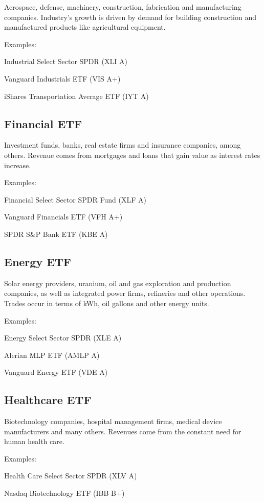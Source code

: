 \documentclass[11pt]{article}
\begin{document}
Aerospace, defense, machinery, construction, fabrication and manufacturing companies. Industry's growth is driven by demand for building construction and manufactured products like agricultural equipment.


Examples:


Industrial Select Sector SPDR (XLI A)


Vanguard Industrials ETF (VIS A+)


iShares Transportation Average ETF (IYT A)


\subsection{Financial ETF}

Investment funds, banks, real estate firms and insurance companies, among others. Revenue comes from mortgages and loans that gain value as interest rates increase.


Examples:


Financial Select Sector SPDR Fund (XLF A)


Vanguard Financials ETF (VFH A+)


SPDR S\&P Bank ETF (KBE A)


\subsection{Energy ETF}

Solar energy providers, uranium, oil and gas exploration and production companies, as well as integrated power firms, refineries and other operations. Trades occur in terms of kWh, oil gallons and other energy units.


Examples:


Energy Select Sector SPDR (XLE A)


Alerian MLP ETF (AMLP A)


Vanguard Energy ETF (VDE A)


\subsection{Healthcare ETF}

Biotechnology companies, hospital management firms, medical device manufacturers and many others. Revenues come from the constant need for human health care.


Examples:


Health Care Select Sector SPDR (XLV A)


Nasdaq Biotechnology ETF (IBB B+)
\end{document}
